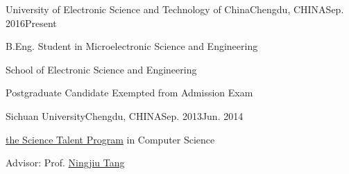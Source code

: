 
\begin{eduitem}{University of Electronic Science and Technology of China}{Chengdu, CHINA}{Sep. 2016}{Present}
\item B.Eng. Student in Microelectronic Science and Engineering
\item School of Electronic Science and Engineering
\item Postgraduate Candidate Exempted from Admission Exam
\end{eduitem}

\begin{eduitem}{Sichuan University}{Chengdu, CHINA}{Sep. 2013}{Jun. 2014}
\item \href{http://ycjh.org}{the Science Talent Program} in Computer Science 
\item Advisor: Prof. \href{http://cs.scu.edu.cn/info/1074/3930.htm}{Ningjiu Tang}
\end{eduitem}

\endinput